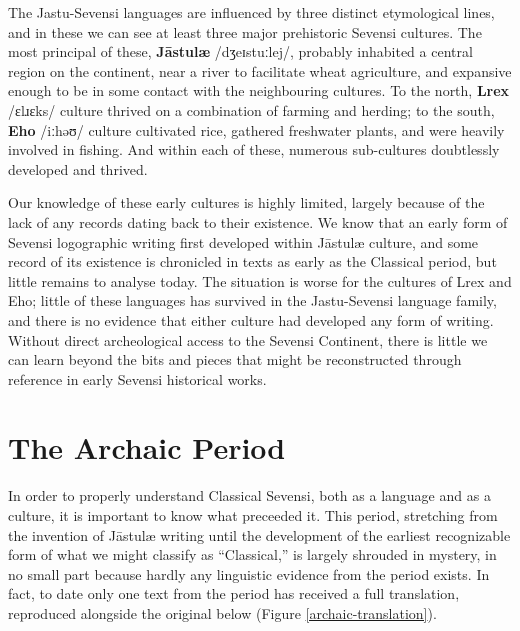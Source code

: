 The Jastu-Sevensi languages are influenced by three distinct etymological lines, and in these we can see at least three major prehistoric Sevensi cultures.
The most principal of these, \textbf{Jāstulæ} /dʒeɪstuːlej/, probably inhabited a central region on the continent, near a river to facilitate wheat agriculture, and expansive enough to be in some contact with the neighbouring cultures.
To the north, \textbf{Lrex} /ɛlɹɛks/ culture thrived on a combination of farming and herding; to the south, \textbf{Eho} /iːhəʊ/ culture cultivated rice, gathered freshwater plants, and were heavily involved in fishing. And within each of these, numerous sub-cultures doubtlessly developed and thrived.

Our knowledge of these early cultures is highly limited, largely because of the lack of any records dating back to their existence.
We know that an early form of Sevensi logographic writing first developed within Jāstulæ culture, and some record of its existence is chronicled in texts as early as the Classical period, but little remains to analyse today.
The situation is worse for the cultures of Lrex and Eho; little of these languages has survived in the Jastu-Sevensi language family, and there is no evidence that either culture had developed any form of writing.
Without direct archeological access to the Sevensi Continent, there is little we can learn beyond the bits and pieces that might be reconstructed through reference in early Sevensi historical works.

\section{The Archaic Period}

In order to properly understand Classical Sevensi, both as a language and as a culture, it is important to know what preceeded it.
This period, stretching from the invention of Jāstulæ writing until the development of the earliest recognizable form of what we might classify as “Classical,” is largely shrouded in mystery, in no small part because hardly any linguistic evidence from the period exists.
In fact, to date only one text from the period has received a full translation, reproduced alongside the original below (Figure \ref{archaic-translation}).

